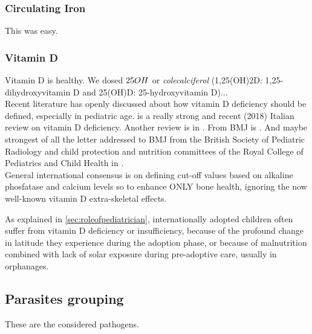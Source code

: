 \subsubsection{Circulating Iron}\label{sub:iron}
This was easy.


\subsubsection{Vitamin D}\label{sub:vitaminD}
Vitamin D is healthy. We dosed $25\-OH$ or \textit{colecalciferol} (1,25(OH)2D: 1,25-dihydroxyvitamin D and 25(OH)D: 25-hydroxyvitamin D)...\\
Recent literature has openly discussed about how vitamin D deficiency should be defined, especially in pediatric age. \cite{vitDcutoff1} is a really strong and recent (2018) Italian review on vitamin D deficiency. Another review is in \cite{vitDcutoff2}. From BMJ is \cite{vitDcutoff3}. And maybe strongest of all the letter addressed to BMJ from the British Society of Pediatric Radiology and child protection and nutrition committees of the Royal College of Pediatrics and Child Health in \cite{vitDcutoff_letter}.\\
General international consensus is on defining cut-off values based on alkaline phosfatase and calcium levels so to enhance ONLY bone health, ignoring the now well-known vitamin D extra-skeletal effects.

As explained in \ref{sec:roleofpediatrician}, internationally adopted children often suffer from vitamin D deficiency or insufficiency, because of the profound change in latitude they experience during the adoption phase, or because of malnutrition combined with lack of solar exposure during pre-adoptive care, usually in orphanages.


\subsection{Parasites grouping}\label{sub:parasites}
These are the considered pathogens.

